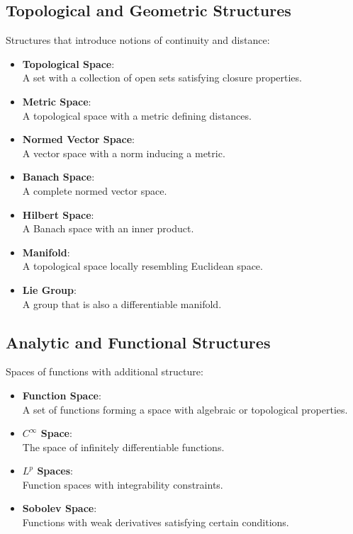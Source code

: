 \documentclass{article}
\begin{document}
\subsection{Topological and Geometric Structures}
Structures that introduce notions of continuity and distance:
\begin{itemize}
    \item \textbf{Topological Space}: \\
        A set with a collection of open sets 
        satisfying closure properties.
    \item \textbf{Metric Space}: \\
        A topological space with a metric defining distances.
    \item \textbf{Normed Vector Space}: \\
        A vector space with a norm inducing a metric.
    \item \textbf{Banach Space}: \\
        A complete normed vector space.
    \item \textbf{Hilbert Space}: \\
        A Banach space with an inner product.
    \item \textbf{Manifold}: \\
        A topological space locally resembling Euclidean space.
    \item \textbf{Lie Group}: \\
        A group that is also a differentiable manifold.
\end{itemize}

\subsection{Analytic and Functional Structures}
Spaces of functions with additional structure:
\begin{itemize}
    \item \textbf{Function Space}: \\
        A set of functions forming a space with 
        algebraic or topological properties.
    \item \textbf{$C^\infty$ Space}: \\
        The space of infinitely differentiable functions.
    \item \textbf{$L^p$ Spaces}: \\
        Function spaces with integrability constraints.
    \item \textbf{Sobolev Space}: \\
        Functions with weak derivatives satisfying 
        certain conditions.
\end{itemize}
\end{document}
